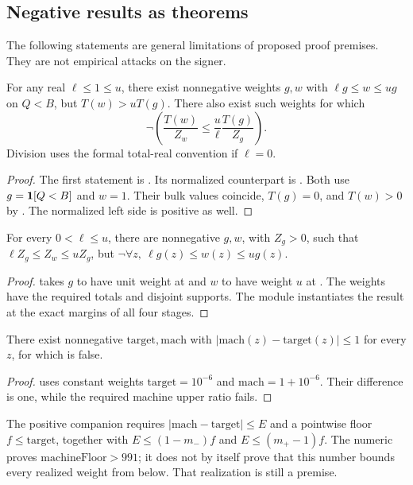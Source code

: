 \subsection{Negative results as theorems}
The following statements are general limitations of proposed proof
premises. They are not empirical attacks on the signer.

\begin{theorem}\label{thm:bulkonly}
For any real $\ell\leq1\leq u$, there exist nonnegative weights $g,w$
with $\ell g\leq w\leq ug$ on $Q<B$, but
$T(w)>uT(g)$. There also exist such weights for which
\[
 \neg\left(\frac{T(w)}{Z_w}\leq\frac{u}{\ell}\frac{T(g)}{Z_g}\right).
\]
Division uses the formal total-real convention if $\ell=0$.
\end{theorem}
\begin{proof}
The first statement is .
Its normalized counterpart is
.
Both use $g=\mathbf{1}[Q<B]$ and $w=1$. Their bulk values coincide, $T(g)=0$,
and $T(w)>0$ by . The normalized left side is
positive as well.
\end{proof}

\begin{theorem}\label{thm:mass}
For every $0<\ell\leq u$, there are nonnegative $g,w$, with $Z_g>0$,
such that $\ell Z_g\leq Z_w\leq uZ_g$, but
$\neg\forall z,\ \ell g(z)\leq w(z)\leq ug(z)$.
\end{theorem}
\begin{proof}
 takes $g$ to have unit weight at
 and $w$ to have weight $u$ at
. The weights have the required totals and
disjoint supports. The module instantiates the result at the exact
margins of all four stages.
\end{proof}

\begin{theorem}\label{thm:additive}
There exist nonnegative $\mathrm{target},\mathrm{mach}$ with
$|\mathrm{mach}(z)-\mathrm{target}(z)|\leq1$ for every $z$, for which
 is false.
\end{theorem}
\begin{proof}
 uses constant weights
$\mathrm{target}=10^{-6}$ and $\mathrm{mach}=1+10^{-6}$.
Their difference is one, while the required machine upper ratio fails.
\end{proof}
The positive companion  requires
$|\mathrm{mach}-\mathrm{target}|\leq E$ and a pointwise floor
$f\leq\mathrm{target}$, together with
$E\leq(1-m_-)f$ and $E\leq(m_+-1)f$.
The numeric  proves $\mathrm{machineFloor}>991$;
it does not by itself prove that this number bounds every realized
weight from below. That realization is still a premise.

